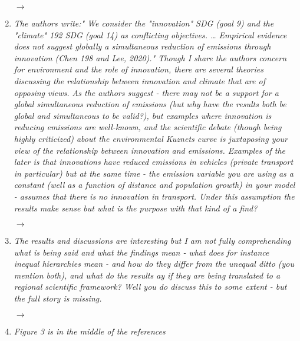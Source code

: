 \documentclass[10pt,a4paper,sans]{moderncv}        %
\begin{document}
\begin{enumerate}
    \medskip
    
    $\rightarrow$

    \bigskip
    

    \item \textit{The authors write:" We consider the "innovation" SDG (goal 9) and the "climate" 192 SDG (goal 14) as conflicting objectives. … Empirical evidence does not suggest globally a simultaneous reduction of emissions through innovation (Chen 198 and Lee, 2020)." Though I share the authors concern for environment and the role of innovation, there are several theories discussing the relationship between innovation and climate that are of opposing views. As the authors suggest - there may not be a support for a global simultaneous reduction of emissions (but why have the results both be global and simultaneous to be valid?), but examples where innovation is reducing emissions are well-known, and the scientific debate (though being highly criticized) about the environmental Kuznets curve is juxtaposing your view of the relationship between innovation and emissions. Examples of the later is that innovations have reduced emissions in vehicles (private transport in particular) but at the same time - the emission variable you are using as a constant (well as a function of distance and population growth) in your model - assumes that there is no innovation in transport. Under this assumption the results make sense but what is the purpose with that kind of a find?}
    
    \medskip
    
    $\rightarrow$
    
    \bigskip
    
    \item \textit{The results and discussions are interesting but I am not fully comprehending what is being said and what the findings mean - what does for instance inequal hierarchies mean - and how do they differ from the unequal ditto (you mention both), and what do the results ay if they are being translated to a regional scientific framework? Well you do discuss this to some extent - but the full story is missing.}
    
    \medskip
    
    $\rightarrow$

    \bigskip
    
    \item \textit{Figure 3 is in the middle of the references}

\end{enumerate}
\end{document}
